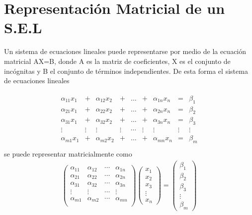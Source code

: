 \section{Representación Matricial de un S.E.L}
Un sistema de ecuaciones lineales puede representarse por medio de la ecuación matricial AX=B, donde A es la matriz de coeficientes, X es el conjunto de incógnitas y B el conjunto de términos independientes. De esta forma el sistema de ecuaciones lineales

\begin{align*}
\begin{array}{ccccccccc}
    \alpha_{11} x_1&+&\alpha_{12} x_2&+&\hdots&+&\alpha_{1n} x_n&=&\beta_1\\
    \alpha_{21} x_1&+&\alpha_{22} x_2&+&\hdots&+&\alpha_{2n} x_n&=&\beta_2\\
    \alpha_{31} x_1&+&\alpha_{32} x_2&+&\hdots&+&\alpha_{3n} x_n&=&\beta_3\\
    \vdots&\vdots&\vdots&\vdots&\cdots&\vdots&\vdots&\vdots&\vdots\\
    \alpha_{m1} x_1&+&\alpha_{m2} x_2&+&\hdots&+&\alpha_{mn} x_n&=&\beta_m\\
\end{array}
\end{align*} 
se puede representar matricialmente como
\begin{align*}
\begin{pmatrix}
    \alpha_{11} &\alpha_{12} &\cdots&\alpha_{1n} \\
    \alpha_{21} &\alpha_{22} &\cdots&\alpha_{2n} \\
    \alpha_{31} &\alpha_{32} &\cdots&\alpha_{3n} \\
    \vdots&\vdots&\cdots&\vdots\\
    \alpha_{m1} &\alpha_{m2} &\cdots&\alpha_{mn}\\
\end{pmatrix}
\begin{pmatrix}
    x_1\\x_2\\x_3\\\vdots\\x_n
\end{pmatrix}
=
\begin{pmatrix}
    \beta_1\\\beta_2\\\beta_3\\\vdots\\\beta_m
\end{pmatrix}
\end{align*}


